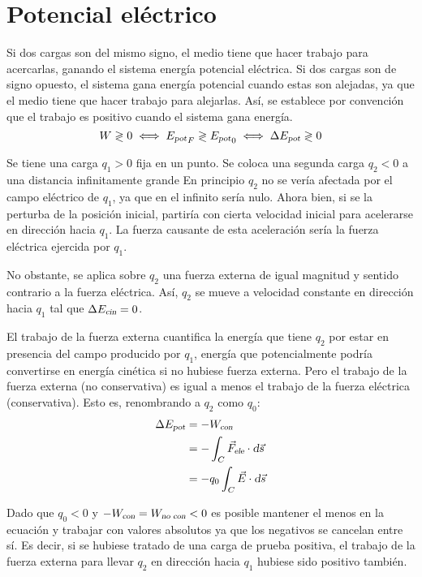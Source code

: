 \documentclass[a5paper,12pt,twoside]{book}
\begin{document}
\section{Potencial eléctrico}

Si dos cargas son del mismo signo, el medio tiene que hacer trabajo para acercarlas, ganando el sistema energía potencial eléctrica.
Si dos cargas son de signo opuesto, el sistema gana energía potencial cuando estas son alejadas, ya que el medio tiene que hacer trabajo para alejarlas.
Así, se establece por convención que el trabajo es positivo cuando el sistema gana energía.
\begin{equation*}
    W \gtrless 0 \iff {{{E}_\textsl{{pot}}}}_F \gtrless {{{E}_\textsl{{pot}}}}_0 \iff \Delta {{E}_\textsl{{pot}}} \gtrless 0
\end{equation*}

Se tiene una carga $q_1 > 0$ fija en un punto.
Se coloca una segunda carga $q_2 < 0$ a una distancia infinitamente grande
En principio $q_2$ no se vería afectada por el campo eléctrico de $q_1$, ya que en el infinito sería nulo.
Ahora bien, si se la perturba de la posición inicial, partiría con cierta velocidad inicial para acelerarse en dirección hacia $q_1$.
La fuerza causante de esta aceleración sería la fuerza eléctrica ejercida por $q_1$.

No obstante, se aplica sobre $q_2$ una fuerza externa de igual magnitud y sentido contrario a la fuerza eléctrica.
Así, $q_2$ se mueve a velocidad constante en dirección hacia $q_1$ tal que $\Delta {{E}_\textsl{{cin}}} = 0$.

El trabajo de la fuerza externa cuantifica la energía que tiene $q_2$ por estar en presencia del campo producido por $q_1$, energía que potencialmente podría convertirse en energía cinética si no hubiese fuerza externa.
Pero el trabajo de la fuerza externa (no conservativa) es igual a menos el trabajo de la fuerza eléctrica (conservativa).
Esto es, renombrando a $q_2$ como $q_0$:
\begin{align*}
    \Delta {{E}_\textsl{{pot}}} &= - {{W}_\textsl{{con}}}
    \\
    &= - \int_C {{\Vec{F}}_\textsl{{ele}}} \cdot \textsl{d} \Vec{s}
    \\
    &= - q_0 \int_C \Vec{E} \cdot \textsl{d} \Vec{s}
\end{align*}

Dado que $q_0 < 0$ y $-{{W}_\textsl{{con}}} = {{W}_\textsl{{no con}}} < 0$ es posible mantener el menos en la ecuación y trabajar con valores absolutos ya que los negativos se cancelan entre sí.
Es decir, si se hubiese tratado de una carga de prueba positiva, el trabajo de la fuerza externa para llevar $q_2$ en dirección hacia $q_1$ hubiese sido positivo también.
\end{document}

